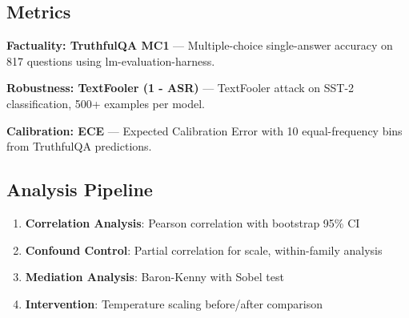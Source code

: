 \subsection{Metrics}

\textbf{Factuality: TruthfulQA MC1} --- Multiple-choice single-answer accuracy on 817 questions using lm-evaluation-harness.

\textbf{Robustness: TextFooler (1 - ASR)} --- TextFooler attack on SST-2 classification, 500+ examples per model.

\textbf{Calibration: ECE} --- Expected Calibration Error with 10 equal-frequency bins from TruthfulQA predictions.

\subsection{Analysis Pipeline}

\begin{enumerate}
    \item \textbf{Correlation Analysis}: Pearson correlation with bootstrap 95\% CI
    \item \textbf{Confound Control}: Partial correlation for scale, within-family analysis
    \item \textbf{Mediation Analysis}: Baron-Kenny with Sobel test
    \item \textbf{Intervention}: Temperature scaling before/after comparison
\end{enumerate}
